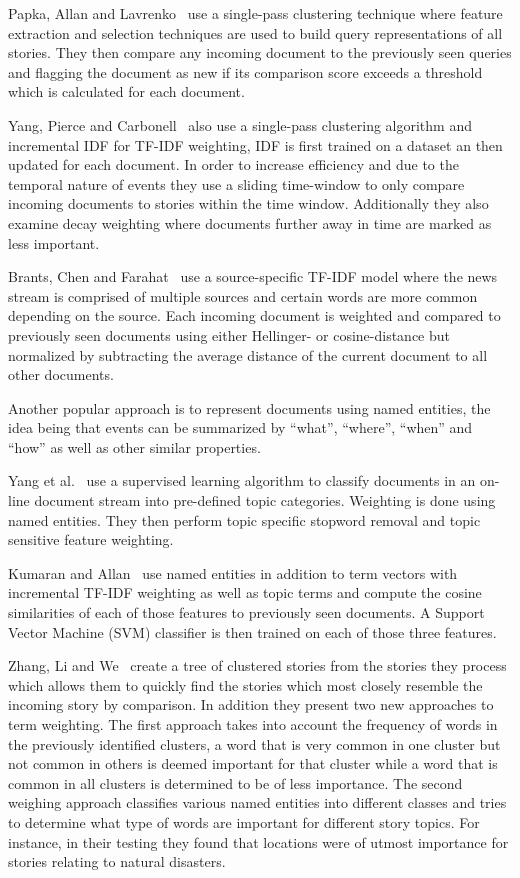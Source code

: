 Papka, Allan and Lavrenko~\cite{papka1998online} use a single-pass clustering technique where feature extraction and selection techniques are used to build query representations of all stories. They then compare any incoming document to the previously seen queries and flagging the document as new if its comparison score exceeds a threshold which is calculated for each document.

Yang, Pierce and Carbonell~\cite{yang1998study} also use a single-pass clustering algorithm and incremental IDF for TF-IDF weighting, IDF is first trained on a dataset an then updated for each document. In order to increase efficiency and due to the temporal nature of events they use a sliding time-window to only compare incoming documents to stories within the time window. Additionally they also examine decay weighting where documents further away in time are marked as less important.

Brants, Chen and Farahat~\cite{brants2003system} use a source-specific TF-IDF model where the news stream is comprised of multiple sources and certain words are more common depending on the source. Each incoming document is weighted and compared to previously seen documents using either Hellinger- or cosine-distance but normalized by subtracting the average distance of the current document to all other documents. 

Another popular approach is to represent documents using named entities, the idea being that events can be summarized  by ``what'', ``where'', ``when'' and ``how'' as well as other similar properties. 

Yang et al.~\cite{yang2002topic} use a supervised learning algorithm to classify documents in an on-line document stream into pre-defined topic categories. Weighting is done using named entities. They then perform topic specific stopword removal and topic sensitive feature weighting.

Kumaran and Allan~\cite{kumaran2005using} use named entities in addition to term vectors with incremental TF-IDF weighting as well as topic terms and compute the cosine similarities of each of those features to previously seen documents. A Support Vector Machine (SVM) classifier is then trained on each of those three features.

Zhang, Li and We~\cite{zhang2007new} create a tree of clustered stories from the stories they process which allows them to quickly find the stories which most closely resemble the incoming story by comparison. In addition they present two new approaches to term weighting. The first approach takes into account the frequency of words in the previously identified clusters, a word that is very common in one cluster but not common in others is deemed important for that cluster while a word that is common in all clusters is determined to be of less importance. The second weighing approach classifies various named entities into different classes and tries to determine what type of words are important for different story topics. For instance, in their testing they found that locations were of utmost importance for stories relating to natural disasters.

